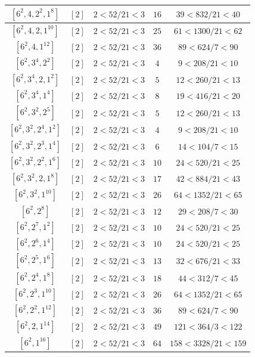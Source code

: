 \documentclass{article}%
\begin{document}
\begin{center}
\begin{longtable}{||c|c|c|c|c||}
$[6^{2}, 4, 2^{2}, 1^{8}]$ & $[2]$ & $2 < 52/21 < 3$ & $16$ & $39 < 832/21 < 40$ \\ \hline 
$[6^{2}, 4, 2, 1^{10}]$ & $[2]$ & $2 < 52/21 < 3$ & $25$ & $61 < 1300/21 < 62$ \\ \hline 
$[6^{2}, 4, 1^{12}]$ & $[2]$ & $2 < 52/21 < 3$ & $36$ & $89 < 624/7 < 90$ \\ \hline 
$[6^{2}, 3^{4}, 2^{2}]$ & $[2]$ & $2 < 52/21 < 3$ & $4$ & $9 < 208/21 < 10$ \\ \hline 
$[6^{2}, 3^{4}, 2, 1^{2}]$ & $[2]$ & $2 < 52/21 < 3$ & $5$ & $12 < 260/21 < 13$ \\ \hline 
$[6^{2}, 3^{4}, 1^{4}]$ & $[2]$ & $2 < 52/21 < 3$ & $8$ & $19 < 416/21 < 20$ \\ \hline 
$[6^{2}, 3^{2}, 2^{5}]$ & $[2]$ & $2 < 52/21 < 3$ & $5$ & $12 < 260/21 < 13$ \\ \hline 
$[6^{2}, 3^{2}, 2^{4}, 1^{2}]$ & $[2]$ & $2 < 52/21 < 3$ & $4$ & $9 < 208/21 < 10$ \\ \hline 
$[6^{2}, 3^{2}, 2^{3}, 1^{4}]$ & $[2]$ & $2 < 52/21 < 3$ & $6$ & $14 < 104/7 < 15$ \\ \hline 
$[6^{2}, 3^{2}, 2^{2}, 1^{6}]$ & $[2]$ & $2 < 52/21 < 3$ & $10$ & $24 < 520/21 < 25$ \\ \hline 
$[6^{2}, 3^{2}, 2, 1^{8}]$ & $[2]$ & $2 < 52/21 < 3$ & $17$ & $42 < 884/21 < 43$ \\ \hline 
$[6^{2}, 3^{2}, 1^{10}]$ & $[2]$ & $2 < 52/21 < 3$ & $26$ & $64 < 1352/21 < 65$ \\ \hline 
$[6^{2}, 2^{8}]$ & $[2]$ & $2 < 52/21 < 3$ & $12$ & $29 < 208/7 < 30$ \\ \hline 
$[6^{2}, 2^{7}, 1^{2}]$ & $[2]$ & $2 < 52/21 < 3$ & $10$ & $24 < 520/21 < 25$ \\ \hline 
$[6^{2}, 2^{6}, 1^{4}]$ & $[2]$ & $2 < 52/21 < 3$ & $10$ & $24 < 520/21 < 25$ \\ \hline 
$[6^{2}, 2^{5}, 1^{6}]$ & $[2]$ & $2 < 52/21 < 3$ & $13$ & $32 < 676/21 < 33$ \\ \hline 
$[6^{2}, 2^{4}, 1^{8}]$ & $[2]$ & $2 < 52/21 < 3$ & $18$ & $44 < 312/7 < 45$ \\ \hline 
$[6^{2}, 2^{3}, 1^{10}]$ & $[2]$ & $2 < 52/21 < 3$ & $26$ & $64 < 1352/21 < 65$ \\ \hline 
$[6^{2}, 2^{2}, 1^{12}]$ & $[2]$ & $2 < 52/21 < 3$ & $36$ & $89 < 624/7 < 90$ \\ \hline 
$[6^{2}, 2, 1^{14}]$ & $[2]$ & $2 < 52/21 < 3$ & $49$ & $121 < 364/3 < 122$ \\ \hline 
$[6^{2}, 1^{16}]$ & $[2]$ & $2 < 52/21 < 3$ & $64$ & $158 < 3328/21 < 159$ \\ \hline 

\end{longtable}
\end{center}
\end{document}
